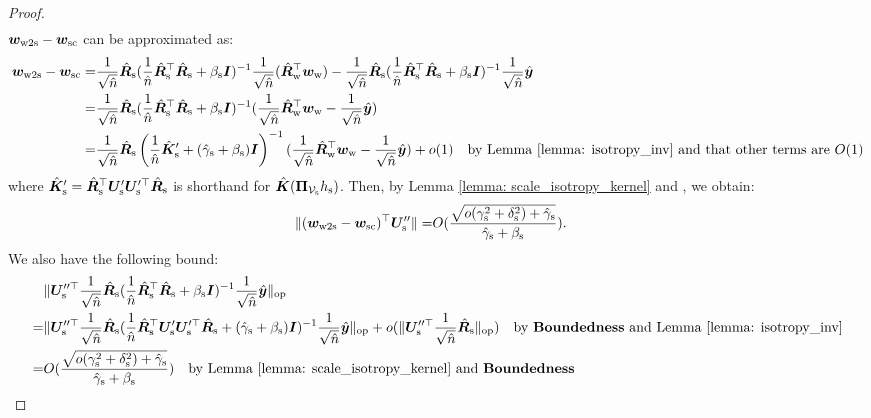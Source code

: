 \begin{proof}
\begin{align}
\end{align}
${\bm{w}}_{\text{w2s}}- {\bm{w}}_{\text{sc}}$ can be approximated as:
\begin{align}
    \nonumber
    {\bm{w}}_{\text{w2s}}- {\bm{w}}_{\text{sc}} = & \frac{1}{\sqrt{\hat{n}}}\hat{{\bm{R}}}_{\text{s}} ( \frac{1}{\hat{n}}\hat{{\bm{R}}}_{\text{s}}^\top \hat{{\bm{R}}}_{\text{s}} +\beta_{\text{s}} {\bm{I}} )^{-1} \frac{1}{\sqrt{\hat{n}}} ( \hat{{\bm{R}}}_{\text{w}}^\top {\bm{w}}_{\text{w}}) - \frac{1}{\sqrt{\hat{n}}}\hat{{\bm{R}}}_{\text{s}} ( \frac{1}{\hat{n}}\hat{{\bm{R}}}_{\text{s}}^\top \hat{{\bm{R}}}_{\text{s}} +\beta_{\text{s}} {\bm{I}} )^{-1} \frac{1}{\sqrt{\hat{n}}} \hat{{\bm{y}}}\\
    \nonumber
    = & \frac{1}{\sqrt{\hat{n}}}\hat{{\bm{R}}}_{\text{s}} ( \frac{1}{\hat{n}}\hat{{\bm{R}}}_{\text{s}}^\top \hat{{\bm{R}}}_{\text{s}} +\beta_{\text{s}} {\bm{I}} )^{-1} (\frac{1}{\sqrt{\hat{n}}}  \hat{{\bm{R}}}_{\text{w}}^\top {\bm{w}}_{\text{w}} - \frac{1}{\sqrt{\hat{n}}} \hat{{\bm{y}}} ) \\
    \label{eq: approx_ww2s_minus_wsc}
    = & \frac{1}{\sqrt{\hat{n}}}\hat{{\bm{R}}}_{\text{s}} \left( \frac{1}{\hat{n}}\hat{{\bm{K}}}_{\text{s}}'  + (\hat{\gamma}_{\text{s}}+\beta_{\text{s}}){\bm{I}}  \right)^{-1} (\frac{1}{\sqrt{\hat{n}}}  \hat{{\bm{R}}}_{\text{w}}^\top {\bm{w}}_{\text{w}} - \frac{1}{\sqrt{\hat{n}}} \hat{{\bm{y}}} )  + o(1) \quad\text{by Lemma \ref{lemma: isotropy_inv} and that other terms are $O(1)$} 
\end{align}
where $\hat{{\bm{K}}}_{\text{s}}' = \hat{{\bm{R}}}_{\text{s}}^\top {\bm{U}}_{\text{s}}' {\bm{U}}_{\text{s}}'^\top \hat{{\bm{R}}}_{\text{s}}$ is shorthand for $\hat{{\bm{K}}}({\bm{\Pi}}_{{\mathcal{V}}_{\text{s}}} h_{\text{s}})$. Then, by Lemma \ref{lemma: scale_isotropy_kernel} and \bounded{}, we obtain:
\begin{align}
    \label{eq: wwu}
    \|({\bm{w}}_{\text{w2s}}- {\bm{w}}_{\text{sc}})^\top {\bm{U}}_{\text{s}}'' \| = & O( \frac{\sqrt{o(\gamma_{\text{s}}^2+\delta_{\text{s}}^2)+\hat{\gamma}_{\text{s}}}}{\hat{\gamma}_{\text{s}}+\beta_{\text{s}}} ).
\end{align}
We also have the following bound:
\begin{align}
    \nonumber
    & \lVert  {\bm{U}}_{\text{s}}''^\top \frac{1}{\sqrt{\hat{n}}}\hat{{\bm{R}}}_{\text{s}} ( \frac{1}{\hat{n}}\hat{{\bm{R}}}_{\text{s}}^\top \hat{{\bm{R}}}_{\text{s}} +\beta_{\text{s}} {\bm{I}} )^{-1} \frac{1}{\sqrt{\hat{n}}} \hat{{\bm{y}}}  \rVert_{\mathrm{op}}\\
    \nonumber
    = &  \lVert {\bm{U}}_{\text{s}}''^\top \frac{1}{\sqrt{\hat{n}}}\hat{{\bm{R}}}_{\text{s}}  ( \frac{1}{\hat{n}}\hat{{\bm{R}}}_{\text{s}}^\top{\bm{U}}_{\text{s}}'{\bm{U}}_{\text{s}}'^\top\hat{{\bm{R}}}_{\text{s}} + (\hat{\gamma}_{\text{s}}+\beta_{\text{s}}){\bm{I}}  )^{-1} \frac{1}{\sqrt{\hat{n}}} \hat{{\bm{y}}}  \rVert_{\mathrm{op}}+ o(\lVert {\bm{U}}_{\text{s}}''^\top \frac{1}{\sqrt{\hat{n}}}\hat{{\bm{R}}}_{\text{s}} \rVert_{\mathrm{op}}) \quad\text{by \textbf{Boundedness}{} and Lemma \ref{lemma: isotropy_inv}}\\
    \label{eq: urrrbetay}
    = &  O( \frac{\sqrt{o(\gamma_{\text{s}}^2+\delta_{\text{s}}^2) +\hat{\gamma}_{\text{s}} }}{ \hat{\gamma}_{\text{s}}+\beta_{\text{s}} } ) \quad\text{by Lemma \ref{lemma: scale_isotropy_kernel} and \textbf{Boundedness}{}}
\end{align}

\end{proof}
